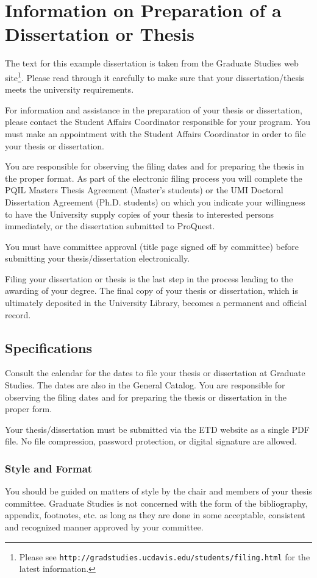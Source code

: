\chapter{Information on Preparation of a Dissertation or Thesis}
%
The text for this example dissertation is taken from the Graduate Studies web site\footnote{Please see \texttt{http://gradstudies.ucdavis.edu/students/filing.html} for the latest information.}. Please read through it carefully to make sure that your dissertation/thesis meets the university requirements.

For information and assistance in the preparation of your thesis or dissertation, please contact the Student Affairs Coordinator responsible for your program. You must make an appointment with the Student Affairs Coordinator in order to file your thesis or dissertation.

You are responsible for observing the filing dates and for preparing the thesis in the proper format. As part of the electronic filing process you will complete the PQIL Masters Thesis Agreement (Master's students) or the UMI Doctoral Dissertation Agreement (Ph.D. students) on which you indicate your willingness to have the University supply copies of your thesis to interested persons immediately, or the dissertation submitted to ProQuest.

You must have committee approval (title page signed off by committee) before submitting your thesis/dissertation electronically.

Filing your dissertation or thesis is the last step in the process leading to the awarding of your degree. The final copy of your thesis or dissertation, which is ultimately deposited in the University Library, becomes a permanent and official record.


\section{Specifications}
%
Consult the calendar for the dates to file your thesis or dissertation at Graduate Studies. The dates are also in the General Catalog. You are responsible for observing the filing dates and for preparing the thesis or dissertation in the proper form.

Your thesis/dissertation must be submitted via the ETD website as a single PDF file. No file compression, password protection, or digital signature are allowed.

\subsection{Style and Format}
%
You should be guided on matters of style by the chair and members of your thesis committee. Graduate Studies is not concerned with the form of the bibliography, appendix, footnotes, etc. as long as they are done in some acceptable, consistent and recognized manner approved by your committee.

